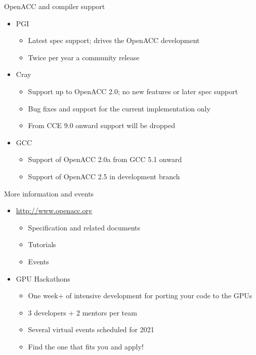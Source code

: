 \documentclass[12pt,aspectratio=169]{beamer}
\begin{document}
\begin{frame}{OpenACC and compiler support}
  \begin{itemize}
  \item PGI
    \begin{itemize}
    \item Latest spec support; drives the OpenACC development
    \item Twice per year a community release
    \end{itemize}
  \item Cray
    \begin{itemize}
    \item Support up to OpenACC 2.0; no new features or later spec support
    \item Bug fixes and support for the current implementation only
    \item From CCE 9.0 onward support will be dropped
    \end{itemize}
  \item GCC
    \begin{itemize}
    \item Support of OpenACC 2.0a from GCC 5.1 onward
    \item Support of OpenACC 2.5 in development branch
    \end{itemize}
  \end{itemize}
\end{frame}

\begin{frame}{More information and events}
  \begin{itemize}
  \item \url{http://www.openacc.org}
    \begin{itemize}
    \item Specification and related documents
    \item Tutorials
    \item Events
    \end{itemize}
    \vfill
  \item GPU Hackathons
    \begin{itemize}
    \item One week+ of intensive development for porting your code to the GPUs
    \item 3 developers + 2 mentors per team
    \item Several virtual events scheduled for 2021
    \item Find the one that fits you and apply!
    \end{itemize}
  \end{itemize}
\end{frame}
\end{document}
